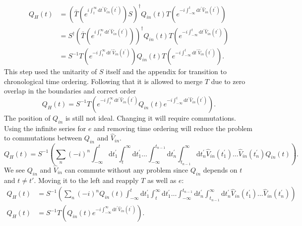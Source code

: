 \documentclass[12pt, titlepage]{article}
\begin{document}
\begin{subequations}
\begin{align}
Q_{H}(t)
&=\left( 
\bar{T}
\left( 
 e^{i\int_{t}^{\infty}\mathrm{d}t^{\prime} \hat{V}_{in}(t^{\prime})}
\right) 
S
\right)^{\dagger}
Q_{in}(t)
T
\left( 
 e^{-i\int_{-\infty}^{t}\mathrm{d}t^{\prime} \hat{V}_{in}(t^{\prime})}
\right) 
\\
&=
S^{\dagger}\left( 
\bar{T}
\left( 
 e^{i\int_{t}^{\infty}\mathrm{d}t^{\prime} \hat{V}_{in}(t^{\prime})}
\right) 
\right)^{\dagger}
Q_{in}(t)
T
\left( 
 e^{-i\int_{-\infty}^{t}\mathrm{d}t^{\prime} \hat{V}_{in}(t^{\prime})}
\right) 
\\
&=
S^{-1} 
T
\left( 
 e^{-i\int_{t}^{\infty}\mathrm{d}t^{\prime} \hat{V}_{in}(t^{\prime})}
\right)
Q_{in}(t)
T
\left( 
 e^{-i\int_{-\infty}^{t}\mathrm{d}t^{\prime} \hat{V}_{in}(t^{\prime})}
\right) .
\end{align}
\end{subequations}
This step used the unitarity of $ S $ itself and the appendix for transition to chronological time ordering. Following that it is allowed to merge $ T $ due to zero overlap in the boundaries and correct order
\begin{equation}
Q_{H}(t)
=S^{-1}
T\left( 
 e^{-i\int_{t}^{\infty}\mathrm{d}t^{\prime} \hat{V}_{in}(t^{\prime})}
Q_{in}(t)
 e^{-i\int_{-\infty}^{t}\mathrm{d}t^{\prime} \hat{V}_{in}(t^{\prime})}
\right) .
\end{equation}
The position of $ Q_{in}  $ is still not ideal. Changing it will require commutations. Using the infinite series for $ e $ and removing time ordering will reduce the problem to commutations between $ Q_{in} $ and $ \hat{V}_{in} $.
\begin{equation}
Q_{H}(t)
=
S^{-1}
\left( 
\sum_{n}
(-i)^{n}
\int_{-\infty}^{t}\mathrm{d}t_{1}^{\prime}
\int_{t}^{\infty}\mathrm{d}t_{1}^{\prime}
\ldots
\int_{-\infty}^{t_{n-1}}\mathrm{d}t_{n}^{\prime}
\int_{t_{n-1}}^{\infty}\mathrm{d}t_{n}^{\prime}
\hat{V}_{in}(t_{1}^{\prime})
\ldots
\hat{V}_{in}(t_{n}^{\prime})
Q_{in}(t)
\right) .
\end{equation}
We see $ Q_{in} $ and $ \hat{V}_{in} $ can commute without any problem since $ Q_{in} $ depends on $  t $ and $ t \neq t' $. Moving it to the left and reapply $ T $ as well as $ e $:
\begin{subequations}
\begin{align}
Q_{H}(t)
&=
S^{-1}
\left( 
\sum_{n}
(-i)^{n}
Q_{in}(t)
\int_{-\infty}^{t}\mathrm{d}t_{1}^{\prime}
\int_{t}^{\infty}\mathrm{d}t_{1}^{\prime}
\ldots
\int_{-\infty}^{t_{n-1}}\mathrm{d}t_{n}^{\prime}
\int_{t_{n-1}}^{\infty}\mathrm{d}t_{n}^{\prime}
\hat{V}_{in}(t_{1}^{\prime})
\ldots
\hat{V}_{in}(t_{n}^{\prime})
\right) 
\\
Q_{H}(t)
&=S^{-1}
T\left( 
Q_{in}(t)
 e^{-i\int_{-\infty}^{\infty}\mathrm{d}t^{\prime} \hat{V}_{in}(t^{\prime})}
\right) .
\end{align}
\end{subequations}
\end{document}
